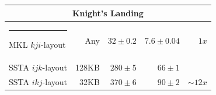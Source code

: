 \documentclass{sig-alternate-05-2015}
\makeatletter
\newcommand{\thickhline}{%
    \noalign {\ifnum 0=`}\fi \hrule height 1pt
    \futurelet \reserved@a \@xhline
}
\makeatother
\begin{document}
\begin{table}[t]
\begin{tabular}{|l|r|r|r|r|}
    \multicolumn{5}{c}{\rule{0pt}{2.25ex} \textbf{Knight's Landing}} \\ \hline \thickhline
    MKL \(kji\)-layout  &   Any &\(32 \pm 0.2\)&\(7.6 \pm 0.04\)& \(1x\) \\ \hline
    SSTA \(ijk\)-layout & 128KB &\(280 \pm 5\)&\(66 \pm 1\)& \\ \hline
    SSTA \(ikj\)-layout &  32KB &\(370 \pm 6\)&\(90 \pm 2\)& \(\sim 12x\) \\ \hline
  \end{tabular}
  \label{tab:results:comparison}
\end{table}

\end{document}
